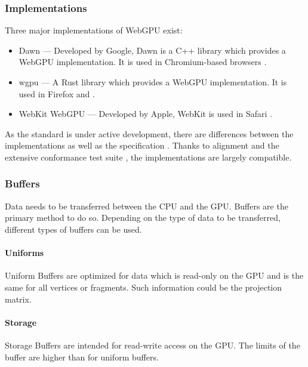 \subsubsection{Implementations}

Three major implementations of WebGPU exist:

\begin{itemize}
    \item{\gls{Dawn}} — Developed by Google, \gls{Dawn} is a C++ library which provides a WebGPU implementation. It is used in Chromium-based browsers \cite{dawnImplementation}.
    \item{\gls{wgpu}} — A Rust library which provides a WebGPU implementation. It is used in Firefox and  \cite{wgpuImplementation}.
    \item{WebKit WebGPU} — Developed by Apple, WebKit is used in Safari \cite{webKitWebGPUImplementation}.
\end{itemize}

As the standard is under active development, there are differences between the implementations as well as the specification \cite{wgpuStandardDeviation}. Thanks to alignment and the extensive conformance test suite \cite{WebGPUConformanceTestSuite}, the implementations are largely compatible.

\subsubsection{Buffers}

Data needs to be transferred between the CPU and the GPU. Buffers are the primary method to do so. Depending on the type of data to be transferred, different types of buffers can be used.

\paragraph{Uniforms}

Uniform Buffers are optimized for data which is read-only on the GPU and is the same for all vertices or fragments. Such information could be the projection matrix.

\paragraph{Storage}

Storage Buffers are intended for read-write access on the GPU. The limits of the buffer are higher than for uniform buffers.

